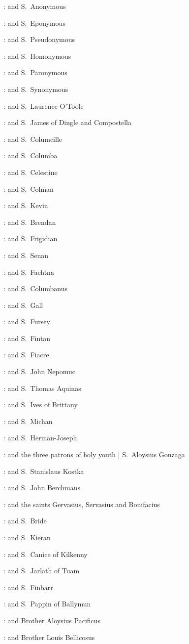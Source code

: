 :
and S.~Anonymous

:
and S.~Eponymous

:
and S.~Pseudonymous

:
and S.~Homonymous

:
and S.~Paronymous

:
and S.~Synonymous

:
and S.~Laurence O'Toole

:
and S.~James of Dingle and Compostella

:
and S.~Columcille

:
and S.~Columba

:
and S.~Celestine

:
and S.~Colman

:
and S.~Kevin

:
and S.~Brendan

:
and S.~Frigidian

:
and S.~Senan

:
and S.~Fachtna

:
and S.~Columbanus

:
and S.~Gall

:
and S.~Fursey

:
and S.~Fintan

:
and S.~Fiacre

:
and S.~John Nepomuc

:
and S.~Thomas Aquinas

:
and S.~Ives of Brittany

:
and S.~Michan

:
and S.~Herman-Joseph

:
and the three patrons of holy youth |
S.~Aloysius Gonzaga

:
and S.~Stanislaus Kostka

:
and S.~John Berchmans

:
and the saints Gervasius,
Servasius
and Bonifacius

:
and S.~Bride

:
and S.~Kieran

:
and S.~Canice of Kilkenny

:
and S.~Jarlath of Tuam

:
and S.~Finbarr

:
and S.~Pappin of Ballymun

:
and Brother Aloysius Pacificus

:
and Brother Louis Bellicosus

